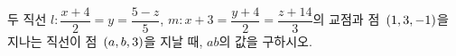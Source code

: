 두 직선 $l\colon \dfrac{x+4}{2}=y=\dfrac{5-z}{5}$, $m\colon x+3=\dfrac{y+4}{2}=\dfrac{z+14}{3}$의 교점과 점~$(1{,}\mkern3mu\mathopen{}3{,}\mkern3mu\mathopen{}-1)$을 지나는 직선이 점~$(a{,}\mkern3mu\mathopen{}b{,}\mkern3mu\mathopen{}3)$을 지날 때, $ab$의 값을 구하시오.
